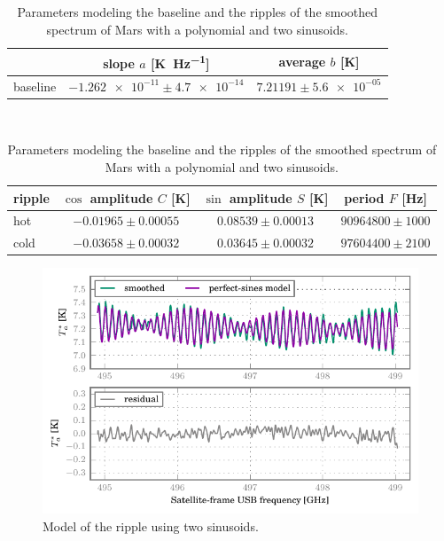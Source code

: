 \begin{table}[b]
    \centering
    \begin{tabularx}{\textwidth}{X c c}
        \toprule
            &
            slope $a$ [\si{\kelvin\per\hertz}]
            &
            average $b$ [\si{\kelvin}]
            \\
        \midrule
            baseline
            &
            $\num{-1.262e-11} \pm \num{4.7e-14}$
            &
            $\num{7.21191} \pm \num{5.6e-05}$
            \\
        \bottomrule
    \end{tabularx}\\
    \bigskip
    \begin{tabularx}{\textwidth}{X c c c}
        \toprule
        ripple
        &
            $\cos$ amplitude $C$ [\si{\kelvin}]
        &
            $\sin$ amplitude $S$ [\si{\kelvin}]
        &
            period $F$ [\si{\hertz}]
        \\
        \midrule
        hot &
        $\num{-0.01965} \pm \num{0.00055}$ &
        $\num{ 0.08539} \pm \num{0.00013}$ &
        $\num{90964800} \pm \num{1000}$ \\
        cold &
        $\num{-0.03658} \pm \num{0.00032}$ &
        $\num{ 0.03645} \pm \num{0.00032}$ &
        $\num{97604400} \pm \num{2100}$\\
        \bottomrule
    \end{tabularx}
    \caption{
        Parameters modeling the baseline and the ripples of the smoothed spectrum of Mars with a polynomial and two sinusoids.
    }
    \label{tab:two_sines_fit}
\end{table}

\begin{figure}
    \centering
    \includegraphics{mars_25_sine_fit}
    \caption{Model of the ripple using two sinusoids.}
    \label{fig:mars_sine_fit}
\end{figure}

